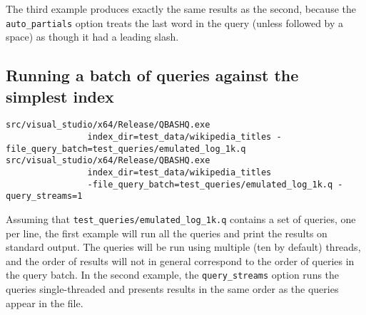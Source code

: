 \documentclass{article}
\begin{document}
\noindent The third example produces exactly the same results as the second,
because the \texttt{auto\_partials} option treats the last word in the
query (unless followed by a space) as though it had a leading slash.


\subsection{Running a batch of queries against the simplest index}
{\footnotesize
\begin{verbatim}
src/visual_studio/x64/Release/QBASHQ.exe
                index_dir=test_data/wikipedia_titles -file_query_batch=test_queries/emulated_log_1k.q 
src/visual_studio/x64/Release/QBASHQ.exe
                index_dir=test_data/wikipedia_titles
                -file_query_batch=test_queries/emulated_log_1k.q -query_streams=1
\end{verbatim}
}

Assuming that \texttt{test\_queries/emulated\_log\_1k.q} contains a
set of queries, one per line, the first example will run all the
queries and print the results on standard output.   The queries will
be run using multiple (ten by default) threads, and the order of
results will not in general correspond to the order of queries in the
query batch.   In the second example, the \texttt{query\_streams}
option runs the queries single-threaded and presents results in the
same order as the queries appear in the file.
\end{document}
